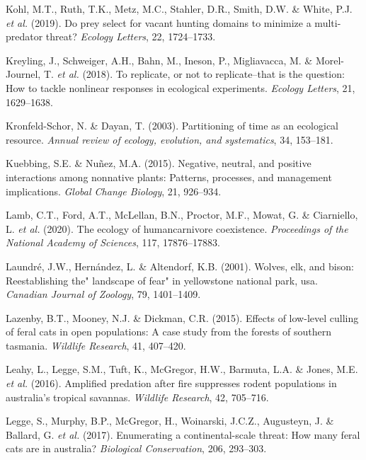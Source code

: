 \documentclass[11pt,a4paper,titlepage,twoside,openright]{style/unimelbthesis}
\begin{document}
\begin{mainmatter}
\leavevmode\hypertarget{ref-kohl2019prey}{}%
Kohl, M.T., Ruth, T.K., Metz, M.C., Stahler, D.R., Smith, D.W. \& White, P.J. \emph{et al.} (2019). Do prey select for vacant hunting domains to minimize a multi-predator threat? \emph{Ecology Letters}, 22, 1724--1733.

\leavevmode\hypertarget{ref-kreyling2018replicate}{}%
Kreyling, J., Schweiger, A.H., Bahn, M., Ineson, P., Migliavacca, M. \& Morel-Journel, T. \emph{et al.} (2018). To replicate, or not to replicate--that is the question: How to tackle nonlinear responses in ecological experiments. \emph{Ecology Letters}, 21, 1629--1638.

\leavevmode\hypertarget{ref-kronfeld2003partitioning}{}%
Kronfeld-Schor, N. \& Dayan, T. (2003). Partitioning of time as an ecological resource. \emph{Annual review of ecology, evolution, and systematics}, 34, 153--181.

\leavevmode\hypertarget{ref-kuebbing2015negative}{}%
Kuebbing, S.E. \& Nuñez, M.A. (2015). Negative, neutral, and positive interactions among nonnative plants: Patterns, processes, and management implications. \emph{Global Change Biology}, 21, 926--934.

\leavevmode\hypertarget{ref-lamb2020ecology}{}%
Lamb, C.T., Ford, A.T., McLellan, B.N., Proctor, M.F., Mowat, G. \& Ciarniello, L. \emph{et al.} (2020). The ecology of humancarnivore coexistence. \emph{Proceedings of the National Academy of Sciences}, 117, 17876--17883.

\leavevmode\hypertarget{ref-laundre2001wolves}{}%
Laundré, J.W., Hernández, L. \& Altendorf, K.B. (2001). Wolves, elk, and bison: Reestablishing the" landscape of fear" in yellowstone national park, usa. \emph{Canadian Journal of Zoology}, 79, 1401--1409.

\leavevmode\hypertarget{ref-lazenby2015effects}{}%
Lazenby, B.T., Mooney, N.J. \& Dickman, C.R. (2015). Effects of low-level culling of feral cats in open populations: A case study from the forests of southern tasmania. \emph{Wildlife Research}, 41, 407--420.

\leavevmode\hypertarget{ref-leahy2016amplified}{}%
Leahy, L., Legge, S.M., Tuft, K., McGregor, H.W., Barmuta, L.A. \& Jones, M.E. \emph{et al.} (2016). Amplified predation after fire suppresses rodent populations in australia's tropical savannas. \emph{Wildlife Research}, 42, 705--716.

\leavevmode\hypertarget{ref-legge2017enumerating}{}%
Legge, S., Murphy, B.P., McGregor, H., Woinarski, J.C.Z., Augusteyn, J. \& Ballard, G. \emph{et al.} (2017). Enumerating a continental-scale threat: How many feral cats are in australia? \emph{Biological Conservation}, 206, 293--303.


\end{mainmatter}
\end{document}
